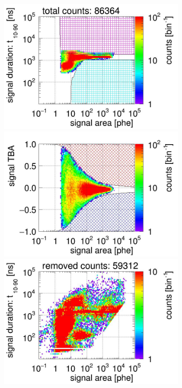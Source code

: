 \begin{landscape}
\begin{figure}[!p]
\begin{subfigure}[t]{0.33\textwidth}
			\includegraphics[width=\figurewidth,clip,trim={0 98 0 0}]{Figures/GasTest/CutsValid/res64771/pdpa23Vecfig64771.jpg}
			\includegraphics[width=\figurewidth,clip,trim={0 98 0 40}]{Figures/GasTest/CutsValid/res64771/tbapa23Vecfig64771.jpg}
			\includegraphics[width=\figurewidth,clip,trim={0 98 0 10}]{Figures/GasTest/CutsValid/res64771/pdpaX23Vecfig64771.jpg}

\end{subfigure}
\end{figure}
\end{landscape}
